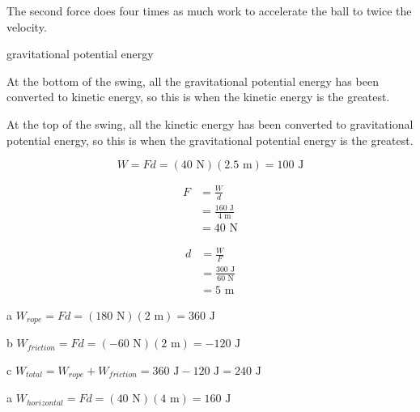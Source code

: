 \documentclass{exam}
\begin{document}
\begin{description}
The second force does four times as much work to accelerate the ball to twice the velocity.

\item[Q22]
\begin{itemize*}
\item gravitational potential energy
\item At the bottom of the swing, all the gravitational potential energy has been converted to kinetic energy, so this is
  when the kinetic energy is the greatest.
\item At the top of the swing, all the kinetic energy has been converted to gravitational potential energy, so this is
  when the gravitational potential energy is the greatest.
\end{itemize*}

\item[E1]
\[
  W = Fd = (40 \text{ N})(2.5 \text{ m}) = 100 \text{ J}
\]
 
\item[E2]
\begin{align*}
  F &= \frac{W}{d} \\
   &= \frac{160 \text{ J}}{4 \text{ m}} \\
   &= 40 \text{ N}  
\end{align*}

\item[E3]
\begin{align*}
  d &= \frac{W}{F} \\
   &= \frac{300 \text{ J}}{60 \text{ N}} \\
   &= 5 \text{ m}  
\end{align*}

\item[E4]
\begin{description*}
\item[a] $W_{rope} = Fd = (180 \text{ N})(2 \text{ m}) = 360 \text{ J}$
\item[b] $W_{friction} = Fd = (-60 \text{ N})(2 \text{ m}) = -120 \text{ J}$
\item[c] $W_{total} = W_{rope} + W_{friction} = 360 \text{ J} - 120 \text{ J} = 240 \text{ J}$
\end{description*}

\item[E5]
\begin{description*}

\item[a] $W_{horizontal} = Fd = (40 \text{ N})(4 \text{ m}) = 160 \text{ J}$


\end{description*}
\end{description}
\end{document}

